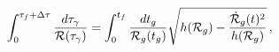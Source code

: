 \begin{equation}\label{timedelay}
\int_0 ^{\tau_f+\Delta\tau} {{d\tau_\gamma}\over {{\cal R}(\tau_\gamma)}} =
\int_0 ^{t_f} {{dt_g}\over
{{\cal R}_g(t_g)}} \sqrt{h({\cal R}_g) - {{\dot {\cal R}_g(t)^2}\over {h({\cal R}_g)}}} \, ,
\end{equation}

